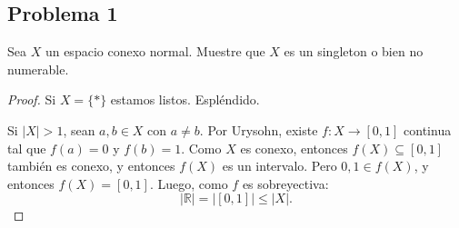 \documentclass{article}
\theoremstyle{definition}
\theoremstyle{remark}
\numberwithin{equation}{section}
\newcommand{\R}{\mathbb{R}}
\newcommand{\abs}[1]{\left| #1 \right|}
\begin{document}
\subsection{Problema 1}
Sea $X$ un espacio conexo normal. Muestre que $X$ es un singleton o bien no numerable.
\begin{proof}
  Si $X = \{*\}$ estamos listos. Espléndido.

  Si $\abs{X}>1$, sean $a,b \in X$ con $a \neq b$. Por Urysohn, existe $f \colon X \to [0,1]$ continua tal que $f(a) = 0$ y $f(b) = 1$. Como $X$ es conexo, entonces $f(X) \subseteq [0,1]$ también es conexo, y entonces $f(X)$ es un intervalo. Pero $0,1 \in f(X)$, y entonces $f(X) = [0,1]$. Luego, como $f$ es sobreyectiva:
  \[\abs\R = \abs{[0,1]} \leq \abs X.\]
\end{proof}

\newpage
\end{document}
